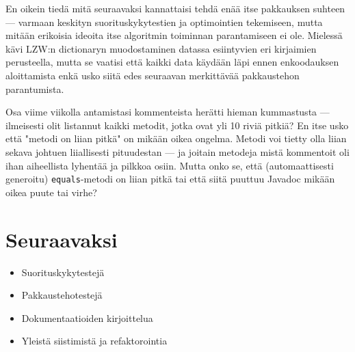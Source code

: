 \documentclass{article}
\begin{document}
En oikein tiedä mitä seuraavaksi kannattaisi tehdä enää itse pakkauksen suhteen --- varmaan keskityn suorituskykytestien ja optimointien tekemiseen, mutta mitään erikoisia ideoita itse algoritmin toiminnan parantamiseen ei ole. Mielessä kävi LZW:n dictionaryn muodostaminen datassa esiintyvien eri kirjaimien perusteella, mutta se vaatisi että kaikki data käydään läpi ennen enkoodauksen aloittamista enkä usko siitä edes seuraavan merkittävää pakkaustehon parantumista.

Osa viime viikolla antamistasi kommenteista herätti hieman kummastusta --- ilmeisesti olit listannut kaikki metodit, jotka ovat yli 10 riviä pitkiä? En itse usko että "metodi on liian pitkä" on mikään oikea ongelma. Metodi voi tietty olla liian sekava johtuen liiallisesti pituudestan --- ja joitain metodeja mistä kommentoit oli ihan aiheellista lyhentää ja pilkkoa osiin. Mutta onko se, että (automaattisesti generoitu) \verb+equals+-metodi on liian pitkä tai että siitä puuttuu Javadoc mikään oikea puute tai virhe?

\section{Seuraavaksi}

\begin{itemize}
    \item Suorituskykytestejä
    \item Pakkaustehotestejä
    \item Dokumentaatioiden kirjoittelua
    \item Yleistä siistimistä ja refaktorointia
\end{itemize}
\end{document}
